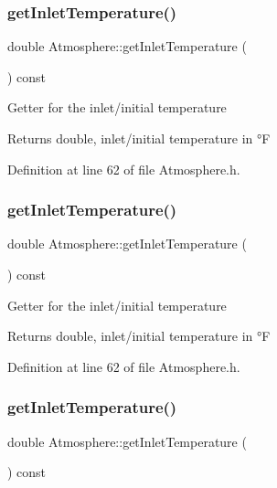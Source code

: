 \subsubsection{\texorpdfstring{get\+Inlet\+Temperature()}{getInletTemperature()}\hspace{0.1cm}{\footnotesize\ttfamily [1/3]}}
{\footnotesize\ttfamily double Atmosphere\+::get\+Inlet\+Temperature (\begin{DoxyParamCaption}{ }\end{DoxyParamCaption}) const\hspace{0.3cm}{\ttfamily [inline]}}

Getter for the inlet/initial temperature \begin{DoxyReturn}{Returns}
double, inlet/initial temperature in °F 
\end{DoxyReturn}


Definition at line 62 of file Atmosphere.\+h.

\mbox{\label{class_atmosphere_acb944a3a99cd40f0132713ce73e6ca4a}} 
\subsubsection{\texorpdfstring{get\+Inlet\+Temperature()}{getInletTemperature()}\hspace{0.1cm}{\footnotesize\ttfamily [2/3]}}
{\footnotesize\ttfamily double Atmosphere\+::get\+Inlet\+Temperature (\begin{DoxyParamCaption}{ }\end{DoxyParamCaption}) const\hspace{0.3cm}{\ttfamily [inline]}}

Getter for the inlet/initial temperature \begin{DoxyReturn}{Returns}
double, inlet/initial temperature in °F 
\end{DoxyReturn}


Definition at line 62 of file Atmosphere.\+h.

\mbox{\label{class_atmosphere_acb944a3a99cd40f0132713ce73e6ca4a}} 
\subsubsection{\texorpdfstring{get\+Inlet\+Temperature()}{getInletTemperature()}\hspace{0.1cm}{\footnotesize\ttfamily [3/3]}}
{\footnotesize\ttfamily double Atmosphere\+::get\+Inlet\+Temperature (\begin{DoxyParamCaption}{ }\end{DoxyParamCaption}) const\hspace{0.3cm}{\ttfamily [inline]}}

